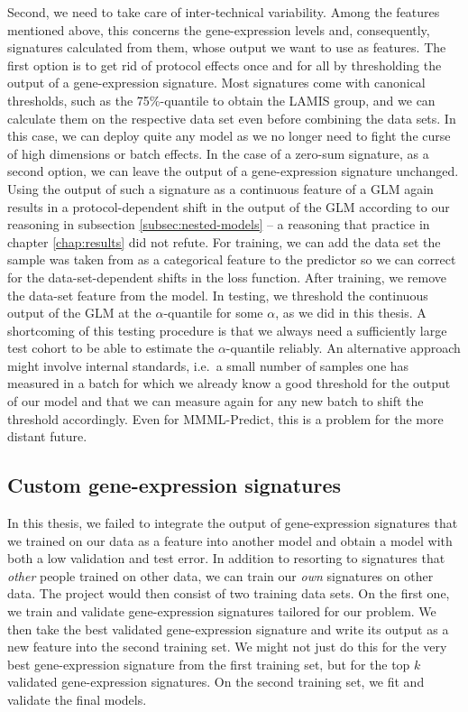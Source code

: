Second, we need to take care of inter-technical variability. Among the features mentioned above, this concerns 
the gene-expression levels and, consequently, signatures calculated from them, whose output 
we want to use as features. The first 
option is to get rid of protocol effects once and for all
by thresholding the output of a gene-expression signature. Most signatures come with canonical thresholds, 
such as the \num{75}\%-quantile to obtain the LAMIS group, and we can calculate them on the 
respective data set even before combining the data sets. In this case, we can deploy quite any model as we no 
longer need to fight the curse of high dimensions or batch effects. In the case of a zero-sum 
signature, as a second option, we can leave the output of a gene-expression signature unchanged. 
Using the output of such a signature as a continuous feature of a GLM again 
results in a protocol-dependent shift in the output of the GLM according to our reasoning in subsection 
\ref{subsec:nested-models} -- a reasoning that practice in chapter \ref{chap:results} did not refute. 
For training, we can add the data set the sample was taken from as a categorical feature to the 
predictor so we can correct for the data-set-dependent shifts in the loss function. 
After training, we remove the data-set feature from the model. In testing, 
we threshold the continuous output of the GLM at the $\alpha$-quantile for some $\alpha$, as we did 
in this thesis. A shortcoming of this testing procedure is that we always need a sufficiently large 
test cohort to be able to estimate the $\alpha$-quantile reliably. An alternative approach might 
involve internal standards, i.e.\ a small number of samples one has measured in a batch for 
which we already know a good threshold for the output of our model and that we can measure again 
for any new batch to shift 
the threshold accordingly. Even for MMML-Predict, this is a problem for the more distant future.

\subsection{Custom gene-expression signatures}

In this thesis, we failed to integrate the output of gene-expression signatures that we trained 
on our data as a feature into another model and obtain a model with both a low validation and test 
error. In addition to resorting to signatures that \textit{other} people trained on other data, we can train 
our \textit{own} signatures on other data. The project would then consist of two training data 
sets. On the first one, we train and validate gene-expression signatures tailored for our problem.
We then take the best validated gene-expression signature and write its output as a new feature into the 
second training set. We might not just do this for the very best gene-expression signature 
from the first training set, but for the top $k$ validated gene-expression signatures. On the second 
training set, we fit and validate the final models.

